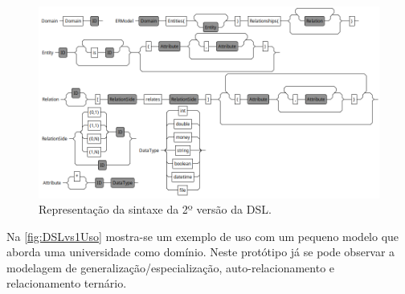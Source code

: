\begin{figure} [!htb]
    \centering
    \caption{Representação da sintaxe da 2º versão da DSL.}
    \label{fig:ERDSL2Syntax}
    \includegraphics[width=\textwidth]{img/ERDSL2SyntaxGraph.png}
\end{figure}

Na \autoref{fig:DSLvs1Uso} mostra-se um exemplo de uso com um pequeno modelo que aborda uma universidade como domínio. 
Neste protótipo já se pode observar a modelagem de generalização/especialização, auto-relacionamento e relacionamento ternário.


